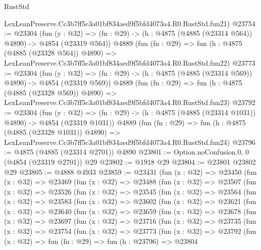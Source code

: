 \begin{lexlean}{RustStd}
\begin{coremodule}
    LexLeanPreserve.Cc3b7ff5c3a01bf834aed9f5bfd4073a4.R0.RustStd.fun21)
@23754 := @23304
    (fun (y : @32) => (fn : @29) -> (h : @4875 (@4885 (@23314 @564)) @4890) -> @4854 (@23319 @564))
    @4889
    (fun (fn : @29) =>
    fun (h : @4875 (@4885 (@23328 @564)) @4890) =>
    LexLeanPreserve.Cc3b7ff5c3a01bf834aed9f5bfd4073a4.R0.RustStd.fun22)
@23773 := @23304
    (fun (y : @32) => (fn : @29) -> (h : @4875 (@4885 (@23314 @569)) @4890) -> @4854 (@23319 @569))
    @4889
    (fun (fn : @29) =>
    fun (h : @4875 (@4885 (@23328 @569)) @4890) =>
    LexLeanPreserve.Cc3b7ff5c3a01bf834aed9f5bfd4073a4.R0.RustStd.fun23)
@23792 := @23304
    (fun (y : @32) =>
    (fn : @29) -> (h : @4875 (@4885 (@23314 @1031)) @4890) -> @4854 (@23319 @1031))
    @4889
    (fun (fn : @29) =>
    fun (h : @4875 (@4885 (@23328 @1031)) @4890) =>
    LexLeanPreserve.Cc3b7ff5c3a01bf834aed9f5bfd4073a4.R0.RustStd.fun24)
@23796 := @4875 (@4885 (@23314 @2701)) @4890
@23801 := Option.noConfusion.{0, 0} (@4854 (@23319 @2701)) @29
@23802 := @1918 @29
@23804 := @23801 @23802 @29
@23805 := @4888 @4933
@23859 := @23431
    (fun (x : @32) =>
    @23450
      (fun (x : @32) =>
      @23469
        (fun (x : @32) =>
        @23488
          (fun (x : @32) =>
          @23507
            (fun (x : @32) =>
            @23526
              (fun (x : @32) =>
              @23545
                (fun (x : @32) =>
                @23564
                  (fun (x : @32) =>
                  @23583
                    (fun (x : @32) =>
                    @23602
                      (fun (x : @32) =>
                      @23621
                        (fun (x : @32) =>
                        @23640
                          (fun (x : @32) =>
                          @23659
                            (fun (x : @32) =>
                            @23678
                              (fun (x : @32) =>
                              @23697
                                (fun (x : @32) =>
                                @23716
                                  (fun (x : @32) =>
                                  @23735
                                    (fun (x : @32) =>
                                    @23754
                                      (fun (x : @32) =>
                                      @23773
                                        (fun (x : @32) =>
                                        @23792
                                          (fun (x : @32) =>
                                          fun (fn : @29) =>
                                          fun (h : @23796) =>
                                          @23804

\end{coremodule}
\end{lexlean}
